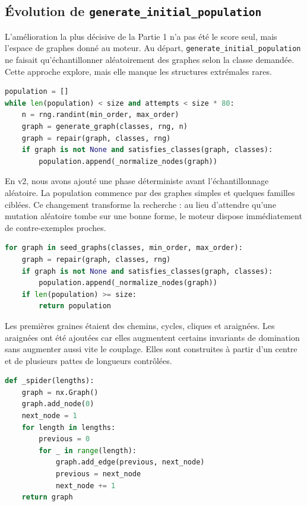 \documentclass[11pt,a4paper]{article}
\begin{document}
\subsection{Évolution de \texttt{generate\_initial\_population}}

L'amélioration la plus décisive de la Partie 1 n'a pas été le score seul, mais l'espace de graphes donné au moteur. Au départ, \texttt{generate\_initial\_population} ne faisait qu'échantillonner aléatoirement des graphes selon la classe demandée. Cette approche explore, mais elle manque les structures extrémales rares.

\begin{lstlisting}[language=Python,caption={Version v1 : population aléatoire réparée.}]
population = []
while len(population) < size and attempts < size * 80:
    n = rng.randint(min_order, max_order)
    graph = generate_graph(classes, rng, n)
    graph = repair(graph, classes, rng)
    if graph is not None and satisfies_classes(graph, classes):
        population.append(_normalize_nodes(graph))
\end{lstlisting}

En v2, nous avons ajouté une phase déterministe avant l'échantillonnage aléatoire. La population commence par des graphes simples et quelques familles ciblées. Ce changement transforme la recherche : au lieu d'attendre qu'une mutation aléatoire tombe sur une bonne forme, le moteur dispose immédiatement de contre-exemples proches.

\begin{lstlisting}[language=Python,caption={Version v2 et suivantes : graines structurelles avant le hasard.}]
for graph in seed_graphs(classes, min_order, max_order):
    graph = repair(graph, classes, rng)
    if graph is not None and satisfies_classes(graph, classes):
        population.append(_normalize_nodes(graph))
    if len(population) >= size:
        return population
\end{lstlisting}

Les premières graines étaient des chemins, cycles, cliques et araignées. Les araignées ont été ajoutées car elles augmentent certains invariants de domination sans augmenter aussi vite le couplage. Elles sont construites à partir d'un centre et de plusieurs pattes de longueurs contrôlées.

\begin{lstlisting}[language=Python,caption={Araignées introduites en v2.}]
def _spider(lengths):
    graph = nx.Graph()
    graph.add_node(0)
    next_node = 1
    for length in lengths:
        previous = 0
        for _ in range(length):
            graph.add_edge(previous, next_node)
            previous = next_node
            next_node += 1
    return graph
\end{lstlisting}
\end{document}
